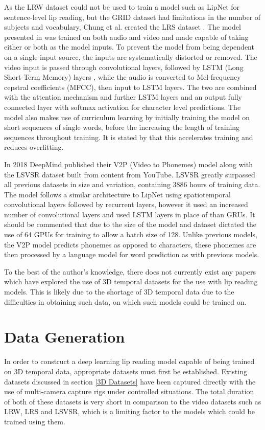 As the LRW dataset could not be used to train a model such as LipNet for sentence-level lip reading, but the GRID dataset had limitations in the number of subjects and vocabulary, Chung et al. created the LRS dataset \cite{Chung2017}.
The model presented in \cite{Chung2017} was trained on both audio and video and made capable of taking either or both as the model inputs.
To prevent the model from being dependent on a single input source, the inputs are systematically distorted or removed.
The video input is passed through convolutional layers, followed by LSTM (Long Short-Term Memory) layers \cite{Cheng2016}, while the audio is converted to Mel-frequency cepstral coefficients (MFCC), then input to LSTM layers.
The two are combined with the attention mechanism and further LSTM layers and an output fully connected layer with softmax activation for character level predictions.
The model also makes use of curriculum learning by initially training the model on short sequences of single words, before the increasing the length of training sequences throughout training.
It is stated by \cite{Chung2017} that this accelerates training and reduces overfitting.

In 2018 DeepMind published their V2P (Video to Phonemes) model \cite{Shillingford2018} along with the LSVSR dataset built from content from YouTube. 
LSVSR greatly surpassed all previous datasets in size and variation, containing 3886 hours of training data.
The model follows a similar architecture to LipNet \cite{Assael2016} using spatiotemporal convolutional layers followed by recurrent layers, however it used an increased number of convolutional layers and used LSTM layers in place of than GRUs.
It should be commented that due to the size of the model and dataset dictated the use of 64 GPUs for training to allow a batch size of 128.
Unlike previous models, the V2P model predicts phonemes as opposed to characters, these phonemes are then processed by a language model for word prediction as with previous models.

To the best of the author's knowledge, there does not currently exist any papers which have explored the use of 3D temporal datasets for the use with lip reading models. 
This is likely due to the shortage of 3D temporal data due to the difficulties in obtaining such data, on which such models could be trained on.

\section{Data Generation}
In order to construct a deep learning lip reading model capable of being trained on 3D temporal data, appropriate datasets must first be established.
Existing datasets \cite{Tzirakis2019, Cudeiro2019} discussed in section \ref{3D Datasets} have been captured directly with the use of multi-camera capture rigs under controlled situations.
The total duration of both of these datasets is very short in comparison to the video datasets such as LRW, LRS and LSVSR, which is a limiting factor to the models which could be trained using them.

